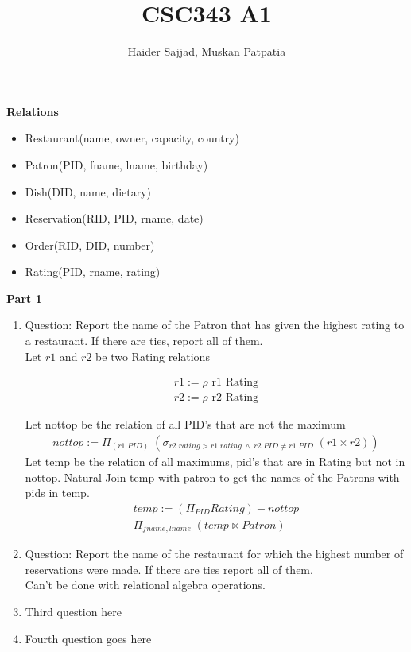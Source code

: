 \documentclass{article}
\begin{document}
\title{CSC343 A1}
\author{Haider Sajjad, Muskan Patpatia}
\maketitle

\begin{LARGE}
\textbf{Relations}
\end{LARGE}

\begin{itemize}
\item Restaurant(name, owner, capacity, country)
\item Patron(PID, fname, lname, birthday)
\item Dish(DID, name, dietary)
\item Reservation(RID, PID, rname, date)
\item Order(RID, DID, number)
\item Rating(PID, rname, rating)
\end{itemize}


\begin{LARGE}
\textbf{Part 1}
\end{LARGE}



\begin{enumerate}
    \item %
    Question: Report the name of the Patron that has given the highest rating to a restaurant. If there are ties,
report all of them.\\
    
        Let $r1$ and $r2$ be two Rating relations
        
        \begin{align}
        r1:= \rho \text{  r1 Rating}  \\
        r2:= \rho \text{  r2 Rating}
		\end{align}     
		
		 Let nottop be the relation of all PID's that are not the maximum
		\begin{align}
        nottop:= \Pi_{(r1.PID)}\;(\sigma_{r2.rating > r1.rating \: \wedge \: r2.PID  \neq r1.PID}\;(r1 \times r2))
		\end{align} 
		Let temp be the relation of all maximums, pid's that are in Rating but not in nottop. Natural Join temp with patron to get the names of the Patrons with pids in temp.
		\begin{align}
        temp:= 	(\Pi_{PID} Rating) - nottop\\
        \Pi_{fname,lname}\;(temp \bowtie Patron)
		\end{align} 
		
       
    \item %
        Question: Report the name of the restaurant for which the highest number of reservations were made. If there
are ties report all of them.\\

        Can't be done with relational algebra operations. 
    \item %
        Third question here
       
    \item %
        Fourth question goes here
\end{enumerate}
\end{document}
